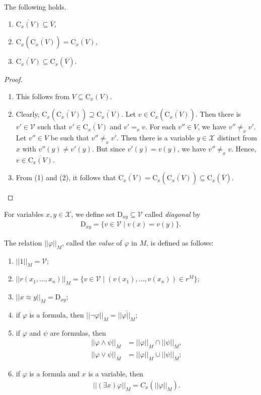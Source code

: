 \documentclass{lmcs}
\def\tu#1{( #1)}
\def\C{\textrm{C}}
\def\D{\textrm{D}}
\def\X{\mathcal X}
\def\V{\mathcal V}
\newcommand{\st}{%
	\ensuremath{\;|\;}
}
\begin{document}
\begin{lem}\label{lem:Cx_overline}
The following holds.
\begin{enumerate}
\item $\overline{\C_x(V)}\subseteq\overline{V}$,
\item $\C_x(\overline{\C_x(V)})= \overline{\C_x(V)}$,
\item $\overline{\C_x(V)}\subseteq \C_x(\overline V)$.
\end{enumerate}
\end{lem}
\begin{proof} ~\newline
\begin{enumerate}
\item This follows from $V\subseteq\C_x(V)$.
\item Clearly, $\C_x(\overline{\C_x(V)})\supseteq\overline{\C_x(V)}$. Let $v\in\C_x(\overline{\C_x(V)})$. Then there is $v'\in\V$ such that $v'\in\overline{\C_x(V)}$ and $v'=_xv$. For each $v''\in V$, we have $v''\not=_xv'$. Let $v''\in V$ be such that $v''\not=_xv'$. Then there is a variable $y\in\X$ distinct from $x$ with $v''(y)\not=v'(y)$.  But since $v'(y)=v(y)$, we have $v''\not=_xv$. Hence, $v\in\overline{\C_x(V)}$.
\item From (1) and (2), it follows that $\overline{\C_x(V)}=\C_x(\overline{\C_x(V)})\subseteq\C_x(\overline{V})$.  \qedhere
\end{enumerate}

\end{proof}

For variables $x,y\in \X$, we define set $\D_{xy}\subseteq\V$ called \emph{diagonal} by
\begin{align}
\D_{xy}=\{v\in \V\st v(x)=v(y)\}. 
\end{align}


The relation $||\varphi||_M$, called the \emph{value} of $\varphi$ in $M$, is defined as follows:
\begin{enumerate}
\item $||1||_M=\V$;
\item $||r(x_1,\ldots,x_n)||_M=\{v\in\V\st \tu{v(x_1),\ldots,v(x_n)}\in r^M \}$;
\item $||x\approx y||_M=\D_{xy}$;
\item if $\varphi$ is a formula, then $||\neg\varphi||_M=\overline{||\varphi||_M}$;
\item if $\varphi$ and $\psi$ are formulas, then
\begin{align*}
||\varphi\wedge\psi||_M&= ||\varphi||_M\cap||\psi||_M,\\
||\varphi\vee\psi||_M&= ||\varphi||_M\cup||\psi||_M;
\end{align*}
\item if $\varphi$ is a formula and $x$ is a variable, then
\begin{align*}
||(\exists x)\varphi||_M=C_x(||\varphi||_M).
\end{align*}
\end{enumerate}
 
\end{document}
